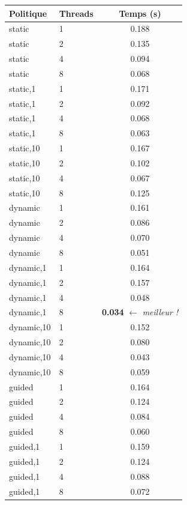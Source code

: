 \documentclass[12pt,a4paper]{article}
\begin{document}
\begin{center}
\begin{tabular}{llc}
\toprule
\textbf{\color{mainblue}Politique} & \textbf{\color{mainblue}Threads} & \textbf{\color{mainblue}Temps (s)} \\
\midrule
static        & 1 & 0.188 \\
static        & 2 & 0.135 \\
static        & 4 & 0.094 \\
static        & 8 & 0.068 \\
\midrule
static,1      & 1 & 0.171 \\
static,1      & 2 & 0.092 \\
static,1      & 4 & 0.068 \\
static,1      & 8 & 0.063 \\
\midrule
static,10     & 1 & 0.167 \\
static,10     & 2 & 0.102 \\
static,10     & 4 & 0.067 \\
static,10     & 8 & 0.125 \\
\midrule
dynamic       & 1 & 0.161 \\
dynamic       & 2 & 0.086 \\
dynamic       & 4 & 0.070 \\
dynamic       & 8 & 0.051 \\
\midrule
dynamic,1     & 1 & 0.164 \\
dynamic,1     & 2 & 0.157 \\
dynamic,1     & 4 & 0.048 \\
\rowcolor{resultgreen} dynamic,1     & 8 & \textbf{0.034} $\leftarrow$ \textit{meilleur !} \\
\midrule
dynamic,10    & 1 & 0.152 \\
dynamic,10    & 2 & 0.080 \\
dynamic,10    & 4 & 0.043 \\
dynamic,10    & 8 & 0.059 \\
\midrule
guided        & 1 & 0.164 \\
guided        & 2 & 0.124 \\
guided        & 4 & 0.084 \\
guided        & 8 & 0.060 \\
\midrule
guided,1      & 1 & 0.159 \\
guided,1      & 2 & 0.124 \\
guided,1      & 4 & 0.088 \\
guided,1      & 8 & 0.072 \\
\bottomrule
\end{tabular}
\end{center}
\end{document}
